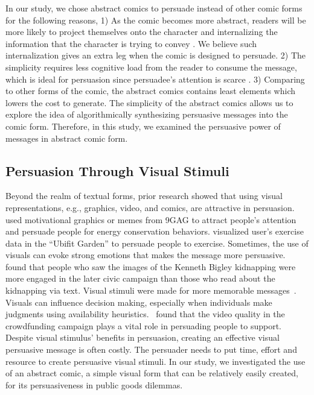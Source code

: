 In our study, we chose abstract comics to persuade instead of other comic forms for the following reasons, 1) As the comic becomes more abstract, readers will be more likely to project themselves onto the character and internalizing the information that the character is trying to convey \cite{scott1993understanding}. We believe such internalization gives an extra leg when the comic is designed to persuade. 2) The simplicity requires less cognitive load from the reader to consume the message, which is ideal for persuasion since persuadee's attention is scarce \cite{Janssen2016}. 3) Comparing to other forms of the comic, the abstract comics contains least elements which lowers the cost to generate. The simplicity of the abstract comics allows us to explore the idea of algorithmically synthesizing persuasive messages into the comic form. Therefore, in this study, we examined the persuasive power of messages in abstract comic form.

\subsection{Persuasion Through Visual Stimuli}
Beyond the realm of textual forms, prior research showed that using visual representations, e.g., graphics, video, and comics, are attractive in persuasion. ~\textcite{selker2015sweetbuildinggreeter} used motivational graphics or memes from 9GAG to attract people's attention and persuade people for energy conservation behaviors. \textcite{consolvo2008activity} visualized user's exercise data in the ``Ubifit Garden'' to persuade people to exercise. Sometimes, the use of visuals can evoke strong emotions that makes the message more persuasive. ~\textcite{iyer2006picture} found that people who saw the images of the Kenneth Bigley kidnapping were more engaged in the later civic campaign than those who read about the kidnapping via text. Visual stimuli were made for more memorable messages~\cite{nisbett1980human}. 
Visuals can influence decision making, especially when individuals make judgments using availability heuristics.~\textcite{dey2017art} found that the video quality in the crowdfunding campaign plays a vital role in persuading people to support. Despite visual stimulus' benefits in persuasion, creating an effective visual persuasive message is often costly. The persuader needs to put time, effort and resource to create persuasive visual stimuli. In our study, we investigated the use of an abstract comic, a simple visual form that can be relatively easily created, for its persuasiveness in public goods dilemmas.

